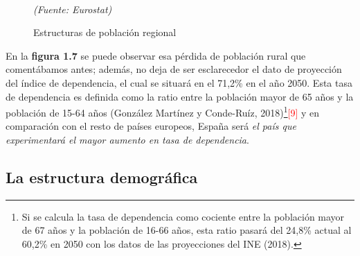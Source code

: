 \begin{figure}[H]
\centering
\hspace*{-1cm}
\caption{Estructuras de poblaci\'on regional}\\
\textit{(Fuente: Eurostat)}
\end{figure}

En la \textbf{figura 1.7} se puede observar esa pérdida de población rural que comentábamos antes; además, no deja de ser esclarecedor el dato de proyección del índice de dependencia, el cual se situará en el 71,2\% en el año 2050. Esta tasa de dependencia es definida como la
ratio entre la poblaci\'on mayor de 65 años y la población de 15-64 años (González Martínez y Conde-Ruíz, 2018)\footnote{Si se calcula la tasa de dependencia como cociente entre la población mayor de 67 años y la población de 16-66 años, esta ratio pasará del 24,8\% actual al 60,2\% en 2050 con los datos de las proyecciones del INE (2018).}\textcolor{red}{[9]} y en comparación con el resto de países europeos, España será \textit{el país que experimentará el mayor aumento en tasa de dependencia}.

\newpage

\subsection{La estructura demogr\'afica}

